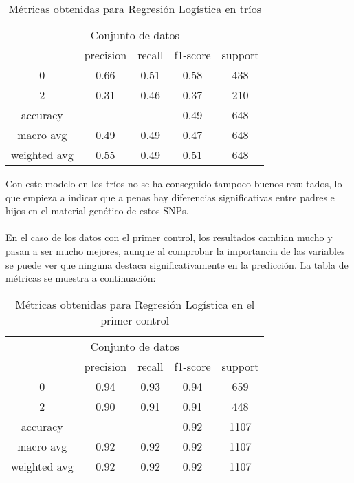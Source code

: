 \begin{table}[H]
  \centering
  \begin{tabular}{ccccc} \toprule
    \multicolumn{5}{c}{Conjunto de datos} \\ \cmidrule(r){1-5}
     & precision & recall & f1-score & support          \\ \midrule
    0 & 0.66 & 0.51 & 0.58 & 438          \\ 
    2 & 0.31 & 0.46 & 0.37 & 210          \\ 
    accuracy &  &  & 0.49 & 648          \\
    macro avg & 0.49 & 0.49 & 0.47 & 648          \\
    weighted avg & 0.55 & 0.49 & 0.51 & 648          \\ \bottomrule
  \end{tabular}
  \caption{Métricas obtenidas para Regresión Logística en tríos}
  \label{tb:info-datasets}
\end{table}
Con este modelo en los tríos no se ha conseguido tampoco buenos resultados, lo que empieza a indicar que a penas hay diferencias significativas entre padres e hijos en el material genético de estos SNPs.\\\\
En el caso de los datos con el primer control, los resultados cambian mucho y pasan a ser mucho mejores, aunque al comprobar la importancia de las variables se puede ver que ninguna destaca significativamente en la predicción. La tabla de métricas se muestra a continuación:

\begin{table}[H]
  \centering
  \begin{tabular}{ccccc} \toprule
    \multicolumn{5}{c}{Conjunto de datos} \\ \cmidrule(r){1-5}
     & precision & recall & f1-score & support          \\ \midrule
    0 & 0.94 & 0.93 & 0.94 & 659          \\ 
    2 & 0.90 & 0.91 & 0.91 & 448          \\ 
    accuracy &  &  & 0.92 & 1107          \\
    macro avg & 0.92 & 0.92 & 0.92 & 1107          \\
    weighted avg & 0.92 & 0.92 & 0.92 & 1107          \\ \bottomrule
  \end{tabular}
  \caption{Métricas obtenidas para Regresión Logística en el primer control}
  \label{tb:info-datasets}
\end{table}

